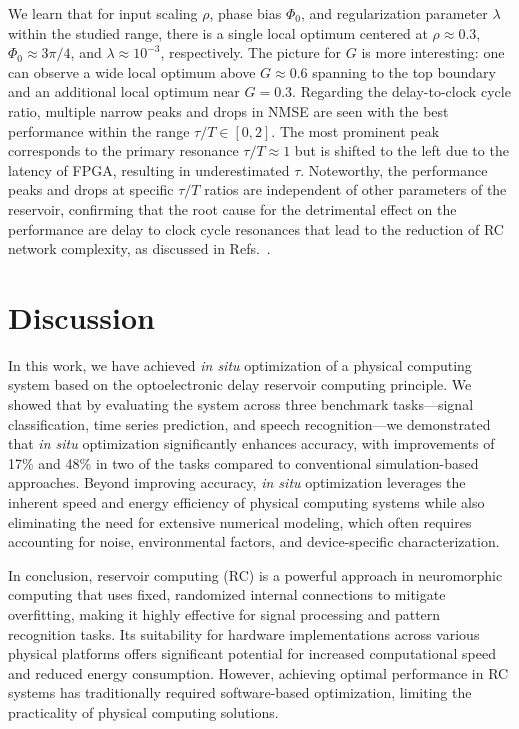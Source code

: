\documentclass{WileyMSP-template}
\begin{document}
We learn that for input scaling $\rho$, phase bias $\Phi_0$, and regularization parameter $\lambda$ within the studied range, there is a single local optimum centered at $\rho\approx0.3$, $\Phi_0\approx3\pi/4$, and $\lambda\approx10^{-3}$, respectively.
The picture for $G$ is more interesting: one can observe a wide local optimum above $G\approx0.6$ spanning to the top boundary and an additional local optimum near $G=0.3$.
Regarding the delay-to-clock cycle ratio, multiple narrow peaks and drops in NMSE are seen with the best performance within the range $\tau/T\in[0, 2]$.
The most prominent peak corresponds to the primary resonance $\tau/T\approx 1$ but is shifted to the left due to the latency of FPGA, resulting in underestimated $\tau$.
Noteworthy, the performance peaks and drops at specific $\tau/T$ ratios are independent of other parameters of the reservoir, confirming that the root cause for the detrimental effect on the performance are delay to clock cycle resonances that lead to the reduction of RC network complexity, as discussed in Refs.~\cite{ref:stelzer2020,ref:koster2021,ref:hulser2022}.

\FloatBarrier

\section{Discussion}
In this work, we have achieved \emph{in situ} optimization of a physical computing system based on the optoelectronic delay reservoir computing principle. 
We showed that by evaluating the system across three benchmark tasks—signal classification, time series prediction, and speech recognition—we demonstrated that \emph{in situ} optimization significantly enhances accuracy, with improvements of 17\% and 48\% in two of the tasks compared to conventional simulation-based approaches.
Beyond improving accuracy, \emph{in situ} optimization leverages the inherent speed and energy efficiency of physical computing systems while also eliminating the need for extensive numerical modeling, which often requires accounting for noise, environmental factors, and device-specific characterization.

In conclusion, reservoir computing (RC) is a powerful approach in neuromorphic computing that uses fixed, randomized internal connections to mitigate overfitting, making it highly effective for signal processing and pattern recognition tasks. Its suitability for hardware implementations across various physical platforms offers significant potential for increased computational speed and reduced energy consumption. However, achieving optimal performance in RC systems has traditionally required software-based optimization, limiting the practicality of physical computing solutions.
\end{document}
